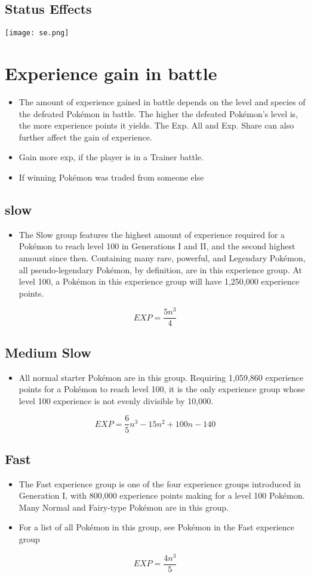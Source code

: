 \documentclass[11pt,fleqn]{book} %
\begin{document}
\subsection{Status Effects}
\texttt{[image: se.png]}\\
\section{Experience gain in battle}
\begin{itemize}
	\item The amount of experience gained in battle depends on the level and species of the defeated Pokémon in battle. The higher the defeated Pokémon’s level is, the more experience points it yields. The Exp. All and Exp. Share can also further affect the gain of experience.
	\item Gain more exp, if the player is in a Trainer battle.
	\item If winning Pokémon was traded from someone else
\end{itemize}
\subsection{slow}
\begin{itemize}
	\item The Slow group features the highest amount of experience required for a Pokémon to reach level 100 in Generations I and II, and the second highest amount since then. Containing many rare, powerful, and Legendary Pokémon, all pseudo-legendary Pokémon, by definition, are in this experience group. At level 100, a Pokémon in this experience group will have 1,250,000 experience points.
\end{itemize}
$$EXP = \frac{5n^3}{4}$$
\subsection{Medium Slow}
\begin{itemize}
	\item All normal starter Pokémon are in this group. Requiring 1,059,860 experience points for a Pokémon to reach level 100, it is the only experience group whose level 100 experience is not evenly divisible by 10,000.
\end{itemize}
$$EXP = \frac{6}{5}n^3-15n^2+100n-140$$
\subsection{Fast}
\begin{itemize}
	\item The Fast experience group is one of the four experience groups introduced in Generation I, with 800,000 experience points making for a level 100 Pokémon. Many Normal and Fairy-type Pokémon are in this group.
	\item For a list of all Pokémon in this group, see Pokémon in the Fast experience group
\end{itemize}
$$EXP = \frac{4n^3}{5}$$
\end{document}
